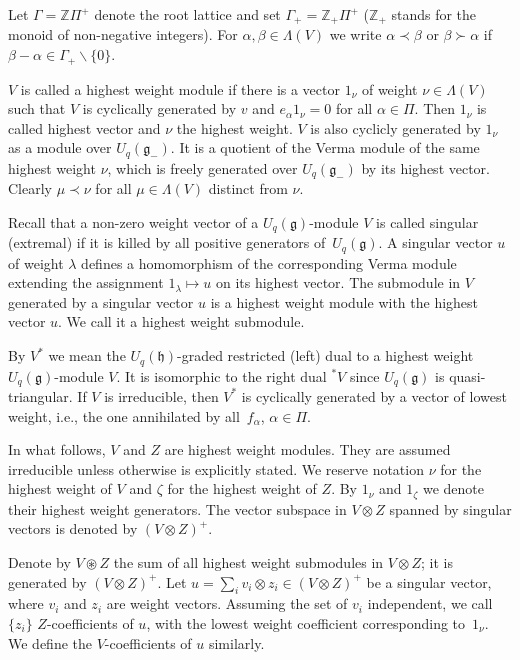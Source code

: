 \documentclass[11pt]{article}
\numberwithin{equation}{section}
\begin{document}
Let $\Gamma=\mathbb{Z}\Pi^+$ denote the root lattice and set $\Gamma_+=\mathbb{Z}_+\Pi^+$ ($\mathbb{Z}_+$ stands for the monoid of non-negative integers). For $\alpha,\beta \in \Lambda(V)$ we write $\alpha\prec \beta$ or $\beta \succ \alpha$ if $\beta-\alpha \in \Gamma_+\backslash \{0\}$.

$V$ is called a highest weight module if there is a vector $1_\nu$ of weight $\nu\in \Lambda(V)$ such that $V$ is cyclically generated by $v$ and $e_\alpha 1_\nu=0$ for all $\alpha \in \Pi$. Then $1_\nu$ is called highest vector and $\nu$ the highest weight. $V$ is also cyclicly generated by $1_\nu$ as a module over $U_q(\mathfrak{g}_-)$. It is a quotient of the Verma module of the same highest weight $\nu$, which is freely generated over $U_q(\mathfrak{g}_-)$ by its highest vector. Clearly $\mu\prec \nu$ for all $\mu\in \Lambda(V)$ distinct from $\nu$.

Recall that a non-zero weight vector of a $U_q(\mathfrak{g})$-module $V$ is called singular (extremal) if it is killed by all positive generators of~$U_q(\mathfrak{g})$. A singular vector $u$ of weight $\lambda$ defines a homomorphism of the corresponding Verma module extending the assignment $1_\lambda\mapsto u$ on its highest vector. The submodule in $V$ generated by a singular vector $u$ is a highest weight module with the highest vector $u$. We call it a highest weight submodule.

By $V^*$ we mean the $U_q(\mathfrak{h})$-graded restricted (left) dual to a highest weight $U_q(\mathfrak{g})$-module $V$. It is isomorphic to the right dual ${}^*\!V$ since $U_q(\mathfrak{g})$ is quasi-triangular. If $V$ is irreducible, then $V^*$ is cyclically generated by a vector of lowest weight, i.e., the one annihilated by all~$f_\alpha$, $\alpha \in \Pi$.

In what follows, $V$ and $Z$ are highest weight modules. They are assumed irreducible unless otherwise is explicitly stated. We reserve notation $\nu$ for the highest weight of $V$ and $\zeta$ for the highest weight of $Z$.
By $1_\nu$ and $1_\zeta$ we denote their highest weight generators. The vector subspace in $V\otimes Z$ spanned by singular vectors is denoted by $(V\otimes Z)^+$.

Denote by $V\circledast Z$ the sum of all highest weight submodules in $V\otimes Z$; it is generated by $(V\otimes Z)^+$. Let $u=\sum_{i}v_i\otimes z_i\in (V\otimes Z)^+$ be a singular vector, where $v_i$ and $z_i$ are weight vectors. Assuming the set of $v_i$ independent, we call $\{z_i\}$ $Z$-coefficients of $u$, with the lowest weight coefficient corresponding to~$1_\nu$. We define the $V$-coefficients of $u$ similarly.
\end{document}
